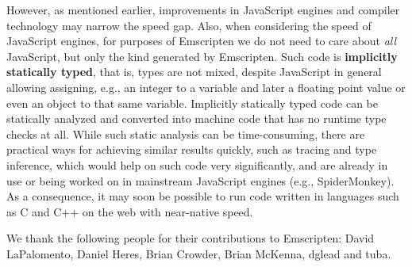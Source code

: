 \documentclass[preprint,10pt]{sigplanconf}
\begin{document}
However, as mentioned earlier, improvements in JavaScript engines and compiler
technology may narrow the speed
gap. Also, when considering the speed of JavaScript engines, for purposes of Emscripten we do not need to
care about \emph{all} JavaScript, but only the kind generated by
Emscripten. Such code is \textbf{implicitly statically typed}, that is,
types are not mixed, despite JavaScript in general allowing assigning, e.g., an
integer to a variable and later a floating point value or even an object to that same variable. Implicitly statically
typed code can be statically analyzed and converted into
machine code that has no runtime type checks at all. While such
static analysis can be time-consuming, there are practical ways for
achieving similar results quickly, such as tracing and type inference, which
would help on such code very significantly, and are already in use
or being worked on in mainstream JavaScript engines (e.g., SpiderMonkey). As
a consequence, it may soon be possible to run code written in languages such as
C and C++ on the web with near-native speed.


\acks

We thank the following people for their contributions to Emscripten: David LaPalomento, Daniel Heres, Brian Crowder, Brian McKenna, dglead and tuba.



\end{document}
